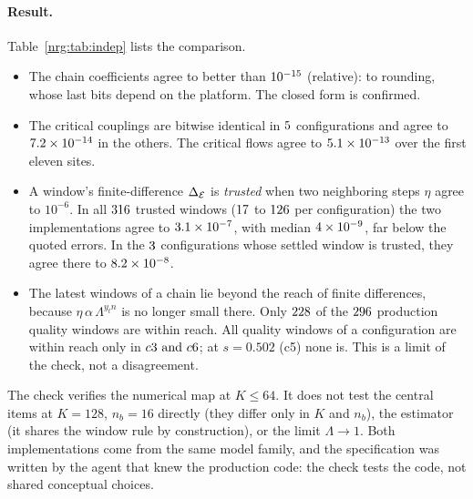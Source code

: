 \paragraph{Result.} Table~\ref{nrg:tab:indep} lists the comparison.
\begin{itemize}
\item The chain coefficients agree to better than $10^{-15}$ (relative): to rounding, whose last bits depend on the platform. The
  closed form is confirmed.
\item The critical couplings are bitwise identical in $5$ configurations and agree to $7.2\times10^{-14}$ in the others.
  The critical flows agree to $5.1\times10^{-13}$ over the first eleven sites.
\item A window's finite-difference $\Delta_{\mathcal E}$ is \emph{trusted} when two neighboring steps $\eta$ agree to $10^{-6}$. In all
  $316$ trusted windows ($17$ to $126$ per configuration) the two implementations agree to
  $3.1\times10^{-7}$, with median $4\times10^{-9}$, far below the quoted errors. In the $3$ configurations whose settled window
  is trusted, they agree there to $8.2\times10^{-8}$.
\item The latest windows of a chain lie beyond the reach of finite differences, because $\eta\,\alpha\,\Lambda^{y_tn}$ is no longer
  small there. Only $228$ of the $296$ production quality windows are within reach. All quality windows of a
  configuration are within reach only in $c3\text{ and }c6$; at $s=0.502$ (c5) none is. This is a limit of the check, not a
  disagreement.
\end{itemize}
The check verifies the numerical map at $K\le64$. It does not test the central items at $K=128$, $n_b=16$ directly (they differ only in
$K$ and $n_b$), the estimator (it shares the window rule by construction), or the limit $\Lambda\to1$. Both implementations come from
the same model family, and the specification was written by the agent that knew the production code: the check tests the code, not
shared conceptual choices.

\begin{table}[ht]\centering\scriptsize\setlength{\tabcolsep}{4pt}
\caption{Second implementation against production. Columns: configuration $(s,\Lambda,K,n_b,N)$; largest relative difference of the
rescaled chain coefficients (a rounding-level bound); relative difference of $\alpha_c$; number of trusted windows; largest window-by-window difference
$|\delta\DE|$ over them; production quality windows within finite-difference reach (covered/all); production quality range.}\label{nrg:tab:indep}

\end{table}

